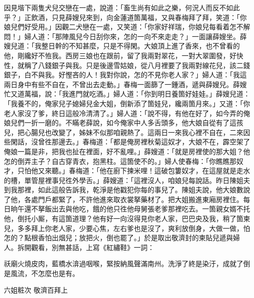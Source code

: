 因見堦下兩隻犬兒交戀在一處，說道：「畜生尚有如此之樂，何況人而反不如此乎？」正飲酒，只見薛嫂兒來到，向金蓮道箇萬福，又與春梅拜了拜，笑道：「你娘兒們好受用。」因觀二犬戀在一處，又笑道：「你家好祥瑞，你娘兒每看着怎不解悶！」婦人道：「那陣風兒今日刮你來，怎的一向不來走走？」一面讓薛嫂坐。薛嫂兒道：「我整日幹的不知甚麼，只是不得閑。大娘頂上進了香來，也不曾看的他，剛纔好不恠我。西房三娘也在跟前，留了我兩對翠花，一對大翠圍發，好快性，就稱了八錢銀子與我。只是後邊雪姑娘，從八月裡要了我兩對線花兒，該二錢銀子，白不與我。好慳吝的人！{}我對你說，怎的不見你老人家？」婦人道：「我這兩日身中有些不自在，不曾出去走動。」春梅一面篩了一鍾酒，遞與薛嫂兒。薛嫂忙又道萬福，說：「我進門就吃酒。」婦人道：「你到明日養箇好娃娃。」薛嫂兒道：「我養不的，俺家兒子媳婦兒金大姐，倒新添了箇娃兒，纔兩箇月來。」{}又道：「你老人家沒了爹，終日這般冷清清了。」婦人道：「說不得，有他在好了，如今弄的俺娘兒們一折一磨的。不瞞老薛說，如今俺家中人多舌頭多，他大娘自從有了這孩兒，把心腸兒也改變了，姊妹不似那咱親熱了。這兩日一來我心裡不自在，二來因些閑話，沒曾徃那邊去。」春梅道：「都是俺房裡秋菊這奴才，大娘不在，霹空架了俺娘一篇是非，把我也扯在裡面，好不亂哩。」{}薛嫂道：「就是房裡使的那大姐？他怎的倒弄主子？自古穿青衣，抱黑柱。這箇使不的。」婦人使春梅：「你瞧瞧那奴才，只怕他又來聽。」{}春梅道：「他在廚下揀米哩！這破包簍奴才，在這屋就是走水的槽，單管屋裡事兒徃外學舌。」薛嫂道：「這裡沒人，咱娘兒每說話。昨日陳姐夫到我那裡，如此這般告訴我，乾淨是他戳犯你每的事兒了。陳姐夫說，他大娘數說了他，各處門戶都緊了，不許他進來取衣裳拏藥材了。把大姐搬進東廂房裡住。每日晌午還不拏飯出去與他吃，餓的他只徃他母舅張老爹那裡吃去。一箇親女婿不托他，倒托小厮，有這箇道理？他有好一向沒得見你老人家，巴巴央及我，稍了箇柬兒，多多拜上你老人家，少要心焦，左右爹也是沒了，爽利放倒身，大做一做，怕怎的？{}點根香怕出烟兒；放把火，倒也罷了。」於是取出敬濟封的柬貼兒遞與婦人。拆開觀看，別無甚話，上寫《紅繡鞋》一詞：

祅廟火燒皮肉，藍橋水渰過咽喉，緊按納風聲滿南州。洗淨了終是染汙，成就了倒是風流，不怎麼也是有。{}

六姐粧次 敬濟百拜上


